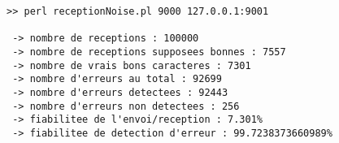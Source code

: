     \begin{lstlisting}
>> perl receptionNoise.pl 9000 127.0.0.1:9001

 -> nombre de receptions : 100000
 -> nombre de receptions supposees bonnes : 7557
 -> nombre de vrais bons caracteres : 7301
 -> nombre d'erreurs au total : 92699
 -> nombre d'erreurs detectees : 92443
 -> nombre d'erreurs non detectees : 256
 -> fiabilitee de l'envoi/reception : 7.301%
 -> fiabilitee de detection d'erreur : 99.7238373660989%

    \end{lstlisting}
